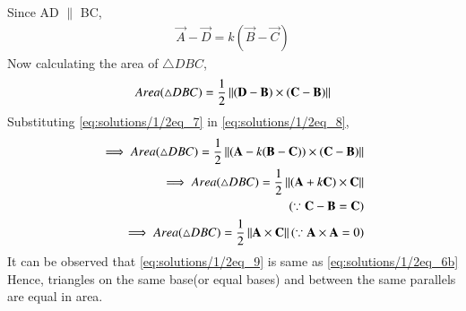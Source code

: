 Since AD $\parallel$ BC,
\begin{align} \label{eq:solutions/1/2eq_7}
    \vec{A} - \vec{D} = k(\vec{B} - \vec{C})
\end{align}
Now calculating the area of $\triangle DBC$,
\begin{align} \label{eq:solutions/1/2eq_8}
    Area(\triangle DBC) = \frac{1}{2}\left\lVert(\mathbf{D} - \mathbf{B}) \times (\mathbf{C}- \mathbf{B})\right\rVert 
\end{align}
Substituting \eqref{eq:solutions/1/2eq_7} in \eqref{eq:solutions/1/2eq_8},
\begin{align}
    \implies Area(\triangle DBC) = \frac{1}{2}\left\lVert (\mathbf{A}-k( \mathbf{B}- \mathbf{C}))\times( \mathbf{C}- \mathbf{B})\right\rVert \nonumber \\
    \implies Area(\triangle DBC) = \frac{1}{2}\left\lVert(\mathbf{A}+k \mathbf{C})\times  \mathbf{C} \right\rVert \nonumber\\    (\because \mathbf{C}- \mathbf{B}= \mathbf{C})\nonumber \\
    \implies Area(\triangle DBC) =  \frac{1}{2}\left\lVert\mathbf{A}\times  \mathbf{C} \right\rVert (\because \mathbf{A} \times \mathbf{A} = 0 ) \label{eq:solutions/1/2eq_9}
\end{align}
It can be observed that \eqref{eq:solutions/1/2eq_9} is same as \eqref{eq:solutions/1/2eq_6b}
Hence, triangles on the same base(or equal bases) and between the same parallels are equal in area.
